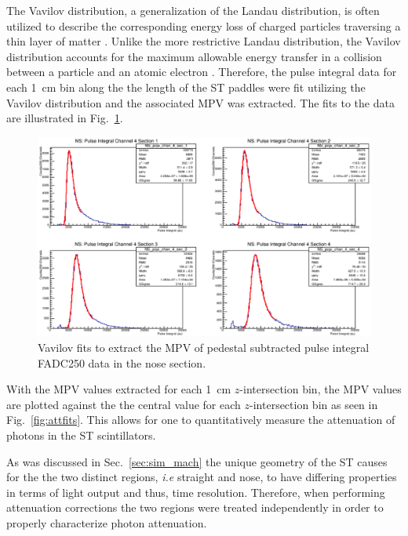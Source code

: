 {The Vavilov distribution, a generalization of the Landau distribution, is often utilized to describe the corresponding energy loss of charged particles traversing a thin layer of matter \cite{seltzer_1964}.  Unlike the more restrictive Landau distribution, the Vavilov distribution accounts for the maximum allowable energy transfer in a collision between a particle and an atomic electron \cite{schorr_1973}.  Therefore, the pulse integral data for each 1~cm bin along the the length of the ST paddles were fit utilizing the Vavilov distribution and the associated MPV was extracted.  The fits to the data are illustrated in Fig.~\ref{fig:pisecnosefits}. 
	\begin{figure}
		\centering
		\includegraphics[width=1.0\columnwidth]{calibration/figs/pi_sec_nose_fits}
		\caption{Vavilov fits to extract the MPV of pedestal subtracted pulse integral FADC250 data in the nose section.}
		\label{fig:pisecnosefits}
	\end{figure}
With the MPV values extracted for each 1~cm $z$-intersection bin, the MPV values are plotted against the the central value for each $z$-intersection bin as seen in Fig.~\ref{fig:attfits}.  This allows for one to quantitatively measure the attenuation of photons in the ST scintillators.

As was discussed in Sec.~\ref{sec:sim_mach} the unique geometry of the ST causes for the the two distinct regions, \textit{i.e} straight and nose, to have differing properties in terms of light output and thus, time resolution.  Therefore, when performing attenuation corrections the two regions were treated independently in order to properly characterize photon attenuation.  

}
